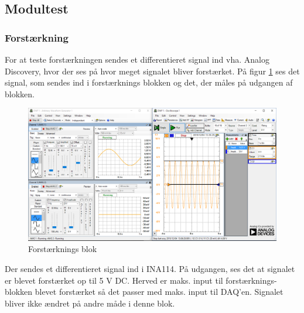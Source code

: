 \subsection{Modultest}
\subsubsection{Forstærkning}
For at teste forstærkningen sendes et differentieret signal ind vha. Analog Discovery, hvor der ses på hvor meget signalet bliver forstærket. 
På figur \ref{fig:forstaerkning} ses det signal, som sendes ind i forstærknings blokken og det, der måles på udgangen af blokken. 
\begin{figure}[H]
	\centering
	\includegraphics[width=1.0\textwidth]{Figurer/forst_blok}
	\caption{Forstærknings blok}
	\label{fig:forstaerkning}
\end{figure}
Der sendes et differentieret signal ind i INA114. På udgangen, ses det at signalet er blevet forstærket op til 5 V DC. Herved er maks. input til forstærknings-blokken blevet forstærket så det passer med maks. input til DAQ'en. Signalet bliver ikke ændret på andre måde i denne blok.

